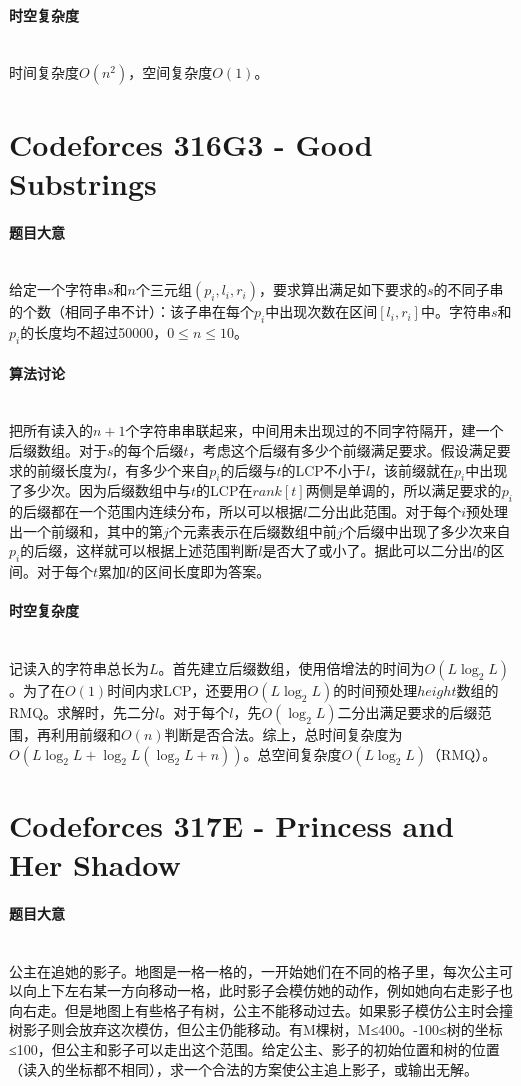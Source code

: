 \documentclass[UTF8]{ctexart}
\newcommand{\myparagraph}[1]{\paragraph{#1}\mbox{}\\}
\theoremstyle{nonumberplain}
\begin{document}
		\myparagraph{时空复杂度}
		
			时间复杂度$O(n^2)$，空间复杂度$O(1)$。
	
	\section{Codeforces 316G3 - Good Substrings}
		
		\myparagraph{题目大意}
		
			给定一个字符串$s$和$n$个三元组$(p_i,l_i,r_i)$，要求算出满足如下要求的$s$的不同子串的个数（相同子串不计）：该子串在每个$p_i$中出现次数在区间$[l_i,r_i]$中。字符串$s$和$p_i$的长度均不超过50000，$0 \leq n \leq 10$。
		
		\myparagraph{算法讨论}
		
			把所有读入的$n+1$个字符串串联起来，中间用未出现过的不同字符隔开，建一个后缀数组。对于$s$的每个后缀$t$，考虑这个后缀有多少个前缀满足要求。假设满足要求的前缀长度为$l$，有多少个来自$p_i$的后缀与$t$的LCP不小于$l$，该前缀就在$p_i$中出现了多少次。因为后缀数组中与$t$的LCP在$rank[t]$两侧是单调的，所以满足要求的$p_i$的后缀都在一个范围内连续分布，所以可以根据$l$二分出此范围。对于每个$i$预处理出一个前缀和，其中的第$j$个元素表示在后缀数组中前$j$个后缀中出现了多少次来自$p_i$的后缀，这样就可以根据上述范围判断$l$是否大了或小了。据此可以二分出$l$的区间。对于每个$t$累加$l$的区间长度即为答案。
		
		\myparagraph{时空复杂度}
		
			记读入的字符串总长为$L$。首先建立后缀数组，使用倍增法的时间为$O(L\log_2L)$。为了在$O(1)$时间内求LCP，还要用$O(L\log_2L)$的时间预处理$height$数组的RMQ。求解时，先二分$l$。对于每个$l$，先$O(\log_2L)$二分出满足要求的后缀范围，再利用前缀和$O(n)$判断是否合法。综上，总时间复杂度为$O(L\log_2L+\log_2L(\log_2L+n))$。总空间复杂度$O(L\log_2L)$（RMQ）。
	
	\section{Codeforces 317E - Princess and Her Shadow}
	
		\myparagraph{题目大意}
		
			公主在追她的影子。地图是一格一格的，一开始她们在不同的格子里，每次公主可以向上下左右某一方向移动一格，此时影子会模仿她的动作，例如她向右走影子也向右走。但是地图上有些格子有树，公主不能移动过去。如果影子模仿公主时会撞树影子则会放弃这次模仿，但公主仍能移动。有M棵树，M≤400。-100≤树的坐标≤100，但公主和影子可以走出这个范围。给定公主、影子的初始位置和树的位置（读入的坐标都不相同），求一个合法的方案使公主追上影子，或输出无解。
		
\end{document}
